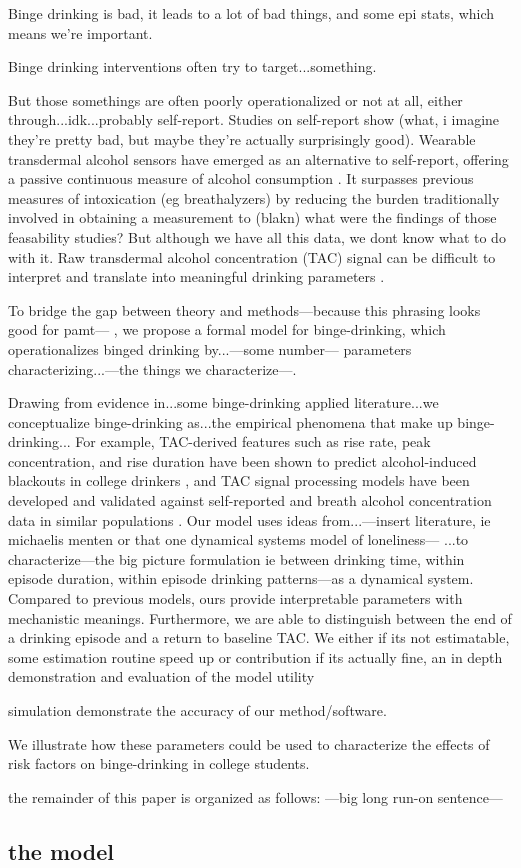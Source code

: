 Binge drinking is bad, it leads to a lot of bad things, 
and some epi stats, which means we're important.

Binge drinking interventions often try to target...something.

But those somethings are often poorly operationalized or not at all, either through...idk...probably
self-report. Studies on self-report show
(what, i imagine they're pretty bad, but maybe they're actually surprisingly good). 
Wearable transdermal alcohol sensors have emerged as an alternative to self-report,
offering a passive continuous measure of alcohol consumption
\parencite{fairbairn2025,gunn2023}. It surpasses previous measures of intoxication (eg
breathalyzers) by reducing the burden traditionally involved in obtaining a measurement to (blakn)
 what were the findings of those feasability studies?  
But although we have all this data, we dont know what to do with it.
Raw transdermal alcohol concentration (TAC) signal
can be difficult to interpret and translate into meaningful drinking parameters
\parencite{gunn2023,kianersi2023}.

To bridge the gap between theory and methods---because this phrasing looks good for pamt---
, we propose a formal model for binge-drinking, which operationalizes
binged drinking by...---some number--- parameters characterizing...---the things we
characterize---. 

Drawing from evidence in...some binge-drinking applied literature...we conceptualize
binge-drinking as...the empirical phenomena that make up binge-drinking...
For example, TAC-derived features such as rise rate, peak concentration, and rise duration
have been shown to predict alcohol-induced blackouts in college drinkers
\parencite{richards2024}, and TAC signal processing models have been developed and validated
against self-reported and breath alcohol concentration data in similar populations
\parencite{kianersi2023}.
Our model uses ideas from...---insert literature, ie michaelis menten
or that one dynamical systems model of loneliness---
...to characterize---the big picture formulation ie between drinking time, within episode
duration, within episode drinking patterns---as a dynamical system. 
Compared to previous models, ours provide interpretable parameters with mechanistic meanings.
Furthermore, we are able to distinguish between the end of a drinking episode and 
a return to baseline TAC. 
We either
if its not estimatable, some estimation routine speed up or contribution 
if its actually fine, an in depth demonstration and evaluation of the model utility

simulation demonstrate the accuracy of our method/software.

We illustrate how these parameters could be used to characterize the effects of risk factors 
on binge-drinking in college students.

the remainder of this paper is organized as follows: ---big long run-on sentence---

\subsection{the model}

